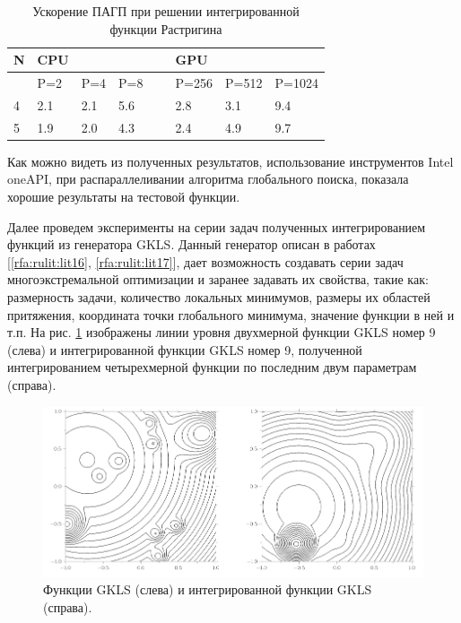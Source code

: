 \documentclass[10pt,a4paper]{book}
\begin{document}
\begin{table}[!ht]
    \centering
            \caption{Ускорение ПАГП при решении интегрированной функции Растригина}
    \label{table2}
    \begin{tabular}{|l|l|l|l|l|l|l|l|}
    \hline
        N & CPU &   & ~ & ~ & GPU  & ~ & ~ \\ \hline
        ~ & P=2 & P=4 & P=8 & ~ & P=256 & P=512 & P=1024  \\ \hline
        4 & 2.1 & 2.1 & 5.6 & ~ & 2.8 & 3.1 & 9.4  \\ \hline
        5 & 1.9 & 2.0 & 4.3 & ~ & 2.4 & 4.9 & 9.7  \\ \hline
    \end{tabular}
\end{table}




Как можно видеть из полученных результатов, использование инструментов Intel oneAPI, при распараллеливании алгоритма глобального поиска, показала хорошие результаты на тестовой функции.

Далее проведем эксперименты на серии задач полученных интегрированием функций из генератора GKLS. Данный генератор описан в работах [\ref{rfa:rulit:lit16}, \ref{rfa:rulit:lit17}], дает возможность создавать серии задач многоэкстремальной оптимизации и заранее задавать их свойства, такие как: размерность задачи, количество локальных минимумов, размеры их областей притяжения, координата точки глобального минимума, значение функции в ней и т.п. На рис. \ref{fig:s3} изображены линии уровня двухмерной функции GKLS номер 9 (слева) и интегрированной функции GKLS номер 9, полученной интегрированием четырехмерной функции по последним двум параметрам (справа).

\begin{figure}
\begin{center}
  \includegraphics[width=1.0\linewidth]{./pic/s3.png}
  \caption{Функции GKLS (слева) и интегрированной функции GKLS (справа).}
  \label{fig:s3}  
\end{center}
\end{figure}
\end{document}

